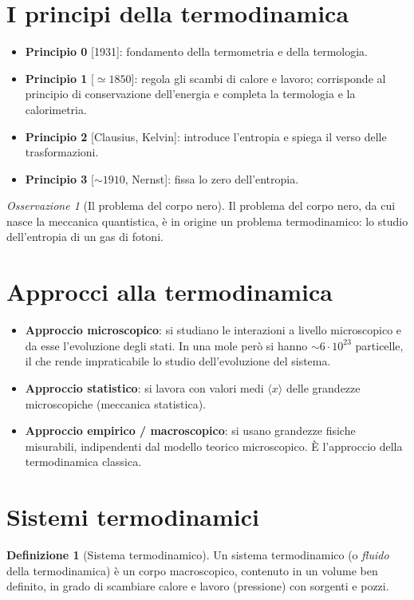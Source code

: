 \documentclass[11pt, a4paper, openright]{book}
\theoremstyle{plain}
\theoremstyle{definition}
\newtheorem{definizione}[teorema]{Definizione}
\theoremstyle{remark}
\newtheorem{osservazione}[teorema]{Osservazione}
\begin{document}
\section{I principi della termodinamica}
\begin{itemize}
    \item \textbf{Principio 0} [1931]: fondamento della termometria e della termologia.
    \item \textbf{Principio 1} [$\simeq 1850$]: regola gli scambi di calore e lavoro; corrisponde al principio di conservazione dell'energia e completa la termologia e la calorimetria.
    \item \textbf{Principio 2} [Clausius, Kelvin]: introduce l'entropia e spiega il verso delle trasformazioni.
    \item \textbf{Principio 3} [$\sim 1910$, Nernst]: fissa lo zero dell'entropia.
\end{itemize}

\begin{osservazione}[Il problema del corpo nero]
    Il problema del corpo nero, da cui nasce la meccanica quantistica, è in origine un problema termodinamico: lo studio dell'entropia di un gas di fotoni.
\end{osservazione}

\section{Approcci alla termodinamica}
\begin{itemize}
    \item \textbf{Approccio microscopico}: si studiano le interazioni a livello microscopico e da esse l'evoluzione degli stati. In una mole però si hanno $\sim 6 \cdot 10^{23}$ particelle, il che rende impraticabile lo studio dell'evoluzione del sistema.
    \item \textbf{Approccio statistico}: si lavora con valori medi $\langle x \rangle$ delle grandezze microscopiche (meccanica statistica).
    \item \textbf{Approccio empirico / macroscopico}: si usano grandezze fisiche misurabili, indipendenti dal modello teorico microscopico. È l'approccio della termodinamica classica.
\end{itemize}

\section{Sistemi termodinamici}
\begin{definizione}[Sistema termodinamico]
    Un sistema termodinamico (o \emph{fluido} della termodinamica) è un corpo macroscopico, contenuto in un volume ben definito, in grado di scambiare calore e lavoro (pressione) con sorgenti e pozzi.
\end{definizione}
\end{document}
